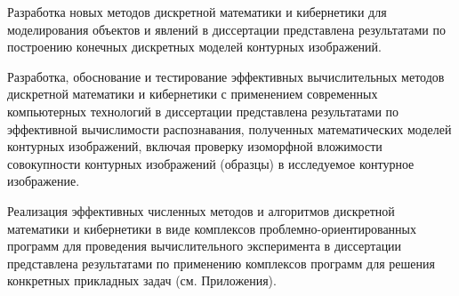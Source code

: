 Разработка новых  методов дискретной математики и  кибернетики для моделирования объектов и явлений  в диссертации представлена результатами по построению конечных дискретных моделей контурных изображений.

Разработка, обоснование и тестирование эффективных вычислительных методов дискретной математики и  кибернетики с применением современных компьютерных технологий в диссертации представлена результатами по эффективной вычислимости распознавания, полученных математических моделей контурных изображений, включая проверку изоморфной вложимости совокупности контурных изображений (образцы) в исследуемое контурное изображение.

Реализация эффективных численных методов и алгоритмов дискретной математики и  кибернетики в виде комплексов проблемно-ориентированных программ для проведения вычислительного эксперимента в диссертации представлена результатами по применению комплексов программ для решения конкретных прикладных задач  (см. Приложения).

